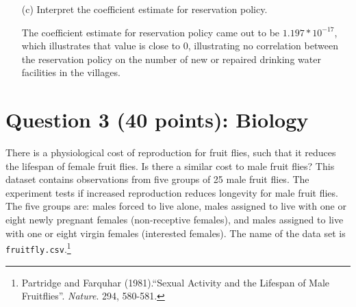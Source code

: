 \documentclass[12pt,letterpaper]{article}
\begin{document}
\begin{enumerate}
	\vspace{4cm}
	\item [(c)] Interpret the coefficient estimate for reservation policy. 



The coefficient estimate for reservation policy came out to be $1.197*10^{-17}$, which illustrates that value is close to 0, illustrating no correlation between the reservation policy on the number of new or repaired drinking water facilities in the villages. 
\end{enumerate}

\newpage
	\section*{Question 3 (40 points): Biology}

There is a physiological cost of reproduction for fruit flies, such that it reduces the lifespan of female fruit flies.  Is there a similar cost to male fruit flies?  This dataset contains observations from five groups of 25 male fruit flies. The experiment tests if increased reproduction reduces longevity for male fruit flies. The five groups are: males forced to live alone, males assigned to live with one or eight newly pregnant females (non-receptive females), and males assigned to live with one or eight virgin females (interested females). The name of the data set is \texttt{fruitfly.csv}.\footnote{Partridge and Farquhar (1981).``Sexual Activity and the Lifespan of Male Fruitflies''. \textit{Nature}. 294, 580-581.}
	\vspace{1cm}
\end{document}
